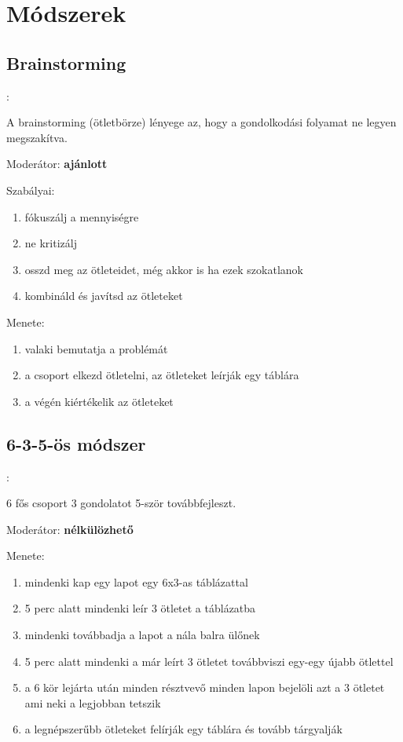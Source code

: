 \documentclass{beamer}
\begin{document}
\section{Módszerek}

\subsection{Brainstorming}
\begin{frame}{\secname : \subsecname}

A brainstorming (ötletbörze) lényege az, hogy a gondolkodási folyamat ne legyen megszakítva.

Moderátor: \textbf{ajánlott}

Szabályai:
\begin{enumerate}
    \item fókuszálj a mennyiségre
    \item ne kritizálj
    \item osszd meg az ötleteidet, még akkor is ha ezek szokatlanok
    \item kombináld és javítsd az ötleteket
\end{enumerate}

Menete:
\begin{enumerate}
    \item valaki bemutatja a problémát
    \item a csoport elkezd ötletelni, az ötleteket leírják egy táblára
    \item a végén kiértékelik az ötleteket
\end{enumerate}
\end{frame}

\subsection{6-3-5-ös módszer}
\begin{frame}{\secname : \subsecname}

6 fős csoport 3 gondolatot 5-ször továbbfejleszt.

Moderátor: \textbf{nélkülözhető}

Menete:
\begin{enumerate}
    \item mindenki kap egy lapot egy 6x3-as táblázattal
    \item 5 perc alatt mindenki leír 3 ötletet a táblázatba
    \item mindenki továbbadja a lapot a nála balra ülőnek
    \item 5 perc alatt mindenki a már leírt 3 ötletet továbbviszi egy-egy újabb ötlettel
    \item a 6 kör lejárta után minden résztvevő minden lapon bejelöli azt a 3 ötletet ami neki a legjobban tetszik
    \item a legnépszerűbb ötleteket felírják egy táblára és tovább tárgyalják
\end{enumerate}

\end{frame}
\end{document}
